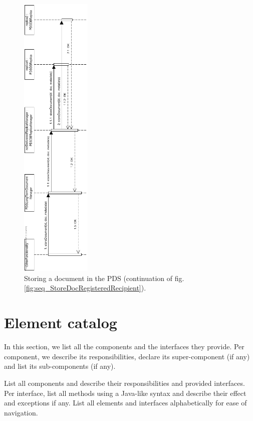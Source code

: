 \documentclass[a4paper,10pt]{article}
\begin{document}
\begin{figure}[!htp]
    \centering
    \includegraphics[width=0.3\textwidth]{Seq_StoreDocPDS.png}
    \caption{Storing a document in the PDS (continuation of fig. \ref{fig:seq_StoreDocRegisteredRecipient}).
        }\label{fig:seq_StoreDocPDS}
\end{figure}

\FloatBarrier

\appendix
\section{Element catalog}\label{app:catalog}
In this section, we list all the components and the interfaces they provide. Per component, we describe its responsibilities, declare its super-component (if any) and list its sub-components (if any).



List all components and describe their responsibilities and provided
interfaces.
Per interface, list all methods using a Java-like syntax and describe their
effect and exceptions if any.
List all elements and interfaces alphabetically for ease of navigation.
\end{document}
